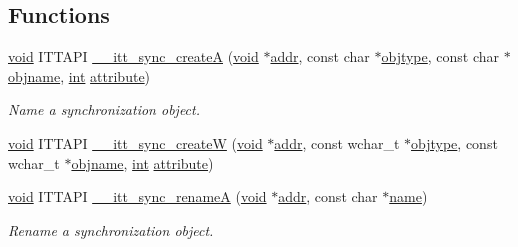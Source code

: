 \subsection*{Functions}
\begin{DoxyCompactItemize}
\item 
\hyperlink{ittnotify__static_8h_af941d56e55e3c5465135b60c4d6343ed}{void} I\-T\-T\-A\-P\-I \hyperlink{group__sync_ga243666487ff4b8904f1629fa15782af4}{\-\_\-\-\_\-itt\-\_\-sync\-\_\-create\-A} (\hyperlink{ittnotify__static_8h_af941d56e55e3c5465135b60c4d6343ed}{void} $\ast$\hyperlink{ittnotify__static_8h_a7e21c61c16fffcc27199a9d66ff39ab8}{addr}, const char $\ast$\hyperlink{ittnotify__static_8h_a94ad88c41c31a6cad0f75a10327296ad}{objtype}, const char $\ast$\hyperlink{ittnotify__static_8h_a5e817ef3c9d2415454921caf87c551f7}{objname}, \hyperlink{ittnotify__static_8h_a8b8dcd723308a8cb5d84277c7a3fff70}{int} \hyperlink{ittnotify__static_8h_abeb49d0a356d83c48cc4c99fccff97be}{attribute})
\begin{DoxyCompactList}\small\item\em Name a synchronization object. \end{DoxyCompactList}\item 
\hyperlink{ittnotify__static_8h_af941d56e55e3c5465135b60c4d6343ed}{void} I\-T\-T\-A\-P\-I \hyperlink{group__sync_ga994a2467bd0fd12e7f32fb12ea4b525b}{\-\_\-\-\_\-itt\-\_\-sync\-\_\-create\-W} (\hyperlink{ittnotify__static_8h_af941d56e55e3c5465135b60c4d6343ed}{void} $\ast$\hyperlink{ittnotify__static_8h_a7e21c61c16fffcc27199a9d66ff39ab8}{addr}, const wchar\-\_\-t $\ast$\hyperlink{ittnotify__static_8h_a94ad88c41c31a6cad0f75a10327296ad}{objtype}, const wchar\-\_\-t $\ast$\hyperlink{ittnotify__static_8h_a5e817ef3c9d2415454921caf87c551f7}{objname}, \hyperlink{ittnotify__static_8h_a8b8dcd723308a8cb5d84277c7a3fff70}{int} \hyperlink{ittnotify__static_8h_abeb49d0a356d83c48cc4c99fccff97be}{attribute})
\item 
\hyperlink{ittnotify__static_8h_af941d56e55e3c5465135b60c4d6343ed}{void} I\-T\-T\-A\-P\-I \hyperlink{group__sync_ga8e0ee60520e20d33f9dce510b978bb3b}{\-\_\-\-\_\-itt\-\_\-sync\-\_\-rename\-A} (\hyperlink{ittnotify__static_8h_af941d56e55e3c5465135b60c4d6343ed}{void} $\ast$\hyperlink{ittnotify__static_8h_a7e21c61c16fffcc27199a9d66ff39ab8}{addr}, const char $\ast$\hyperlink{ittnotify__static_8h_a1c34b35a4952969fef60192313bba34a}{name})
\begin{DoxyCompactList}\small\item\em Rename a synchronization object. \end{DoxyCompactList}\item 

\end{DoxyCompactItemize}
